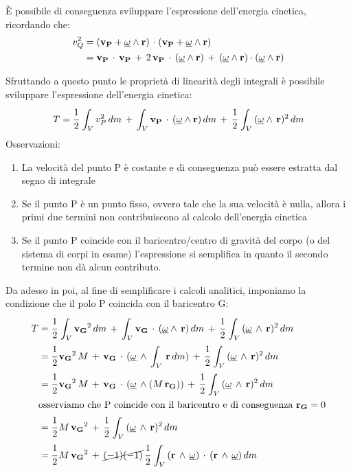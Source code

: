 È possibile di conseguenza sviluppare l'espressione dell'energia cinetica, ricordando che:
\begin{align*}
v_Q^2 &= (\mathbf{v_P} + \underline{\omega}\wedge\mathbf{r})\,\cdot (\mathbf{v_P} + \underline{\omega}\wedge\mathbf{r}) \\
&= \mathbf{v_P}\,\cdot\,\mathbf{v_P}\,+\,2\,\mathbf{v_P}\,\cdot\,(\underline{\omega}\wedge\mathbf{r})\,+\,(\underline{\omega}\wedge\mathbf{r})\cdot(\underline{\omega}\wedge\mathbf{r})
\end{align*}

Sfruttando a questo punto le proprietà di linearità degli integrali è possibile sviluppare l'espressione dell'energia cinetica:
\[T = \cfrac{1}{2}\,\int_V v_P^2\,dm\,+\,\int_V \mathbf{v_P}\,\cdot\,(\underline{\omega}\wedge\mathbf{r})\,dm\,+\,\cfrac{1}{2}\,\int_V\,(\underline{\omega}\wedge\,\mathbf{r})^2\,dm\]
Osservazioni:
\begin{enumerate}
\item La velocità del punto P è costante e di conseguenza può essere estratta dal segno di integrale
\item Se il punto P è un punto fisso, ovvero tale che la sua velocità è nulla, allora i primi due termini non contribuiscono al calcolo dell'energia cinetica
\item Se il punto P coincide con il baricentro/centro di gravità del corpo (o del sistema di corpi in esame) l'espressione si semplifica in quanto il secondo termine non dà alcun contributo.
\end{enumerate}

Da adesso in poi, al fine di semplificare i calcoli analitici, imponiamo la condizione che il polo P coincida con il baricentro G:
\begin{align*}
T &= \cfrac{1}{2}\,\int_V \mathbf{v_G}^2\,dm \,+\,\int_V \mathbf{v_G}\,\cdot\,(\underline{\omega}\wedge\,\mathbf{r})\,dm\,+\,\cfrac{1}{2}\,\int_V\,(\underline{\omega}\,\wedge\,\mathbf{r})^2\,dm\\
&= \cfrac{1}{2}\,\mathbf{v_G}^2 \,M\,+\,\mathbf{v_G}\,\cdot\,(\underline{\omega}\,\wedge\,\int_V\,\mathbf{r}\,dm)\,+\,\cfrac{1}{2}\,\int_V\,(\underline{\omega}\,\wedge\,\mathbf{r})^2\,dm\\
&= \cfrac{1}{2}\,\mathbf{v_G}^2 \,M\,+\,\mathbf{v_G}\,\cdot\,(\underline{\omega}\,\wedge (M\,\mathbf{r_G}))\,+\,\cfrac{1}{2}\,\int_V\,(\underline{\omega}\,\wedge\,\mathbf{r})^2\,dm\\
&\text{osserviamo che P coincide con il baricentro e di conseguenza } \mathbf{r_G} = 0\\
&=  \cfrac{1}{2}\,M\,\mathbf{v_G}^2 \,+\,\cfrac{1}{2}\,\int_V\,(\underline{\omega}\,\wedge\,\mathbf{r})^2\,dm\\
&=  \cfrac{1}{2}\,M\,\mathbf{v_G}^2 \,+\,\cancel{(-1)(-1)}\,\cfrac{1}{2}\,\int_V\,(\mathbf{r}\,\wedge\,\underline{\omega})\,\cdot\,(\mathbf{r}\,\wedge\,\underline{\omega})\,dm
\end{align*}

